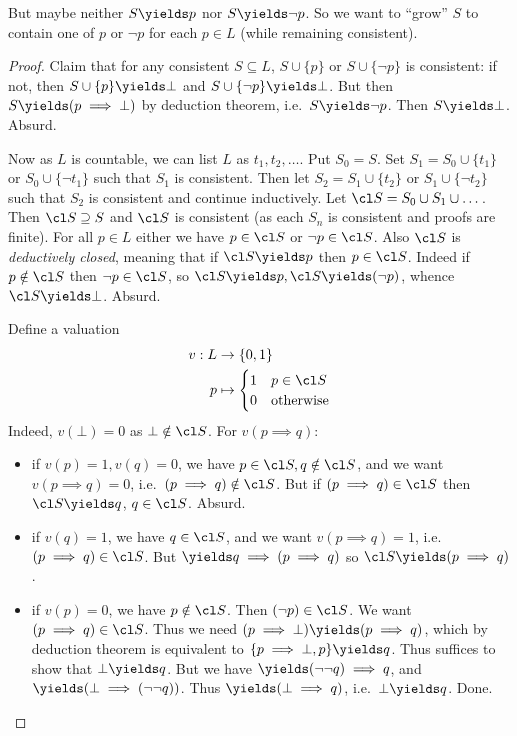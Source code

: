 \documentclass[a4paper]{article}
\begin{document}
But maybe neither \(S \yields p\) nor \(S \yields \neg p\). So we want to ``grow'' \(S\) to contain one of \(p\) or \(\neg p\) for each \(p \in L\) (while remaining consistent).

\begin{proof}
  Claim that for any consistent \(S \subseteq L\), \(S \cup \{p\}\) or \(S \cup \{\neg p\}\) is consistent: if not, then \(S \cup \{p\} \yields \bot\) and \(S \cup \{\neg p\} \yields \bot\). But then \(S \yields (p \implies \bot)\) by deduction theorem, i.e.\ \(S \yields \neg p\). Then \(S \yields \bot\). Absurd.

  Now as \(L\) is countable, we can list \(L\) as \(t_1, t_2, \dots \). Put \(S_0 = S\). Set \(S_1 = S_0 \cup \{t_1\}\) or \(S_0 \cup \{\neg t_1\}\) such that \(S_1\) is consistent. Then let \(S_2 = S_1 \cup \{t_2\}\) or \(S_1 \cup \{\neg t_2\}\) such that \(S_2\) is consistent and continue inductively. Let \(\cl S = S_0 \cup S_1 \cup \dots\). Then \(\cl S \supseteq S\) and \(\cl S\) is consistent (as each \(S_n\) is consistent and proofs are finite). For all \(p \in L\) either we have \(p \in \cl S\) or \(\neg p \in \cl S\). Also \(\cl S\) is \emph{deductively closed}, meaning that if \(\cl S \yields p\) then \(p \in \cl S\). Indeed if \(p \notin \cl S\) then \(\neg p \in \cl S\), so \(\cl S \yields p, \cl S \yields (\neg p)\), whence \(\cl S \yields \bot\). Absurd.

  Define a valuation
  \begin{align*}
    v: L &\to \{0, 1\} \\
    p &\mapsto
        \begin{cases}
          1 & p \in \cl S \\
          0 & \text{otherwise}
        \end{cases}
  \end{align*}
  Indeed, \(v(\bot) = 0\) as \(\bot \notin \cl S\). For \(v(p \implies q)\):
  \begin{itemize}
  \item if \(v(p) = 1, v(q) = 0\), we have \(p \in \cl S, q \notin \cl S\), and we want \(v(p \implies q) = 0\), i.e.\ \((p \implies q) \notin \cl S\). But if \((p \implies q) \in \cl S\) then \(\cl S \yields q\), \(q \in \cl S\). Absurd.
  \item if \(v(q) = 1\), we have \(q \in \cl S\), and we want \(v(p \implies q) = 1\), i.e.\ \((p \implies q) \in \cl S\). But \(\yields q \implies (p \implies q)\) so \(\cl S \yields (p \implies q)\).
  \item if \(v(p) = 0\), we have \(p \notin \cl S\). Then \((\neg p) \in \cl S\). We want \((p \implies q) \in \cl S\). Thus we need \((p \implies \bot) \yields (p \implies q)\), which by deduction theorem is equivalent to \(\{p \implies \bot, p\} \yields q\). Thus suffices to show that \(\bot \yields q\). But we have \(\yields (\neg \neg q) \implies q\), and \(\yields (\bot \implies (\neg \neg q))\). Thus \(\yields (\bot \implies q)\), i.e.\ \(\bot \yields q\). Done.
  \end{itemize}
\end{proof}
\end{document}
